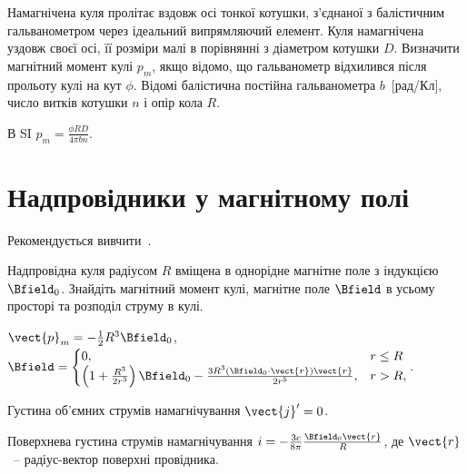 \begin{problem} %
Намагнічена куля пролітає вздовж осі тонкої котушки, з'єднаної з балістичним гальванометром через ідеальний випрямляючий елемент. Куля намагнічена уздовж своєї осі, її розміри малі в порівнянні з діаметром котушки $D$. Визначити магнітний момент кулі $p_m$, якщо відомо, що гальванометр відхилився після прольоту кулі на кут $\phi$. Відомі балістична постійна гальванометра $b$~[рад/Кл], число витків котушки $n$ і опір кола $R$.
\begin{solution}
	В SI $p_m = \frac{\phi R D}{4\pi b n}$.
\end{solution}
\end{problem}

\section{Надпровідники у магнітному полі}


\begin{Theory}
	Рекомендується вивчити~\cite[\S~80]{Siv3}.
\end{Theory}
\begin{problem}\label{sphere:Superconductor_in_field} %
Надпровідна куля радіусом $R$ вміщена в однорідне магнітне поле з індукцією $\Bfield_0$. Знайдіть магнітний момент кулі, магнітне поле $\Bfield$ в усьому просторі та розподіл струму в кулі.
\begin{solution}
	$\vect{p}_m = - \frac12 R^3\Bfield_0$,
	$
		\Bfield =
		\begin{cases}
			0,                                                                                                & r \le R \\
			\left( 1 + \frac{R^3}{2r^3}\right)\Bfield_0 - \frac{3R^3(\Bfield_0\cdot \vect{r})\vect{r}}{2r^5}, & r > R,
		\end{cases}.
	$

	Густина об'ємних струмів намагнічування $\vect{j}' = 0$.

	Поверхнева густина струмів намагнічування
	$i = -\frac{3c}{8\pi} \frac{\Bfield_0\vect{r}}{R}$,
	де $\vect{r}$~-- радіус-вектор поверхні провідника.
\end{solution}
\end{problem}

